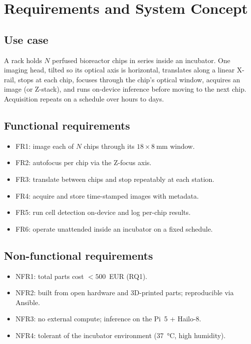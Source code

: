 \section{Requirements and System Concept}
\label{sec:requirements}

\subsection{Use case}
A rack holds $N$ perfused bioreactor chips in series inside an incubator. One
imaging head, tilted so its optical axis is horizontal, translates along a
linear X-rail, stops at each chip, focuses through the chip's optical window,
acquires an image (or Z-stack), and runs on-device inference before moving to
the next chip. Acquisition repeats on a schedule over hours to days.

\subsection{Functional requirements}
\begin{itemize}
\item FR1: image each of $N$ chips through its
  $18\times\SI{8}{\milli\meter}$ window.
\item FR2: autofocus per chip via the Z-focus axis.
\item FR3: translate between chips and stop repeatably at each station.
\item FR4: acquire and store time-stamped images with metadata.
\item FR5: run cell detection on-device and log per-chip results.
\item FR6: operate unattended inside an incubator on a fixed schedule.
\end{itemize}

\subsection{Non-functional requirements}
\begin{itemize}
\item NFR1: total parts cost $< \num{500}$~EUR (RQ1).
\item NFR2: built from open hardware and 3D-printed parts; reproducible via
  Ansible.
\item NFR3: no external compute; inference on the Pi~5 + Hailo-8.
\item NFR4: tolerant of the incubator environment (\SI{37}{\celsius}, high
  humidity). 
\end{itemize}


